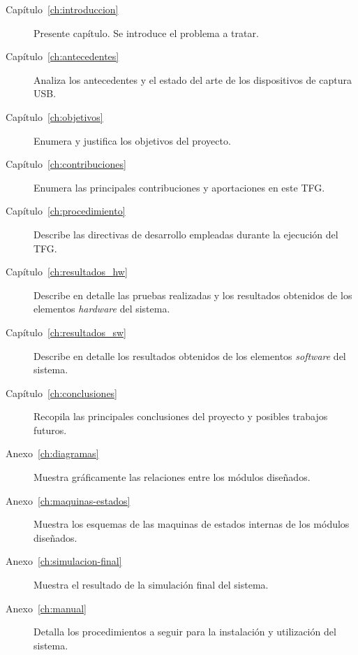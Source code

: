 \begin{description}
    \item[Capítulo~\ref{ch:introduccion}]
    Presente capítulo. Se introduce el problema a tratar.
    
    \item[Capítulo~\ref{ch:antecedentes}]
    Analiza los antecedentes y el estado del arte de los dispositivos de captura USB.
    
    \item[Capítulo~\ref{ch:objetivos}]
    Enumera y justifica los objetivos del proyecto.
    
    \item[Capítulo~\ref{ch:contribuciones}]
    Enumera las principales contribuciones y aportaciones en este TFG.
    
    \item[Capítulo~\ref{ch:procedimiento}]
    Describe las directivas de desarrollo empleadas durante la ejecución del TFG.
    
    \item[Capítulo~\ref{ch:resultados_hw}]
    Describe en detalle las pruebas realizadas y los resultados obtenidos de los elementos \emph{hardware} del sistema.
    
    \item[Capítulo~\ref{ch:resultados_sw}]
    Describe en detalle los resultados obtenidos de los elementos \emph{software} del sistema.
    
    \item[Capítulo~\ref{ch:conclusiones}]
    Recopila las principales conclusiones del proyecto y posibles trabajos futuros.
    
    \item[Anexo~\ref{ch:diagramas}]
    Muestra gráficamente las relaciones entre los módulos diseñados.
    
    \item[Anexo~\ref{ch:maquinas-estados}]
    Muestra los esquemas de las maquinas de estados internas de los módulos diseñados.
    
    \item[Anexo~\ref{ch:simulacion-final}]
    Muestra el resultado de la simulación final del sistema.
    
    \item[Anexo~\ref{ch:manual}]
    Detalla los procedimientos a seguir para la instalación y utilización del sistema.
\end{description}


